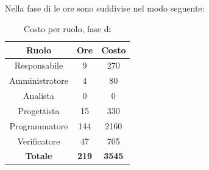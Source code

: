 \subsection{\Cod}
Nella fase di \Cod le ore sono suddivise nel modo seguente:
\begin{table}[H]
	\centering
	\begin{tabular}{|c|c|c|}
		\hline
		\textbf{Ruolo} &
		\textbf{Ore} &
		\textbf{Costo} \\
		\hline
		Responsabile & 9 & 270 \\
		\hline
		Amministratore & 4 & 80 \\
		\hline
		Analista & 0 & 0\\
		\hline
		Progettista & 15 & 330 \\
		\hline
		Programmatore & 144 & 2160 \\
		\hline
		Verificatore & 47 & 705 \\
		\hline
		\textbf{Totale} & \textbf{219} & \textbf{3545} \\
		\hline
	\end{tabular}
	\caption{Costo per ruolo, fase di \Cod}
\end{table}

